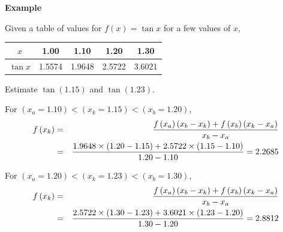    \begin{MyExample}{\begin{center}{\bf Example}\end{center}}
      \begin{example}
         Given a table of values for $f(x)=\tan{x}$ for a few values of $x$,
            \begin{center}
               \begin{tabular}{c | c c c c}
                   $x$        & 1.00   & 1.10   & 1.20   & 1.30   \\
                   \hline
                   $\tan{x}$  & 1.5574 & 1.9648 & 2.5722 & 3.6021 \\
               \end{tabular}
            \end{center}
            Estimate $\tan{(1.15)}$ and $\tan{(1.23)}$.
     \end{example}

        For $\left(x_{a}=1.10\right) < \left(x_{k}=1.15\right) < \left(x_{b}=1.20\right)$,
               \begin{eqnarray}
                  f\left(x_{k}\right) &=& \displaystyle\frac{f\left(x_{a}\right)\left(x_{b}-x_{k}\right) + f\left(x_{b}\right)\left(x_{k}-x_{a}\right)}{x_{b}-x_{a}} \nonumber \\
                                     &=& \displaystyle\frac{1.9648\times(1.20-1.15) + 2.5722\times(1.15-1.10)}{1.20-1.10} = 2.2685 \nonumber
               \end{eqnarray}

For  $\left(x_{a}=1.20\right) < \left(x_{k}=1.23\right) < \left(x_{b}=1.30\right)$,
               \begin{eqnarray}
                  f\left(x_{k}\right) &=& \displaystyle\frac{f\left(x_{a}\right)\left(x_{b}-x_{k}\right) + f\left(x_{b}\right)\left(x_{k}-x_{a}\right)}{x_{b}-x_{a}} \nonumber \\
                                     &=& \displaystyle\frac{2.5722\times(1.30-1.23) + 3.6021\times(1.23-1.20)}{1.30-1.20} = 2.8812 \nonumber
               \end{eqnarray}
   \end{MyExample}

